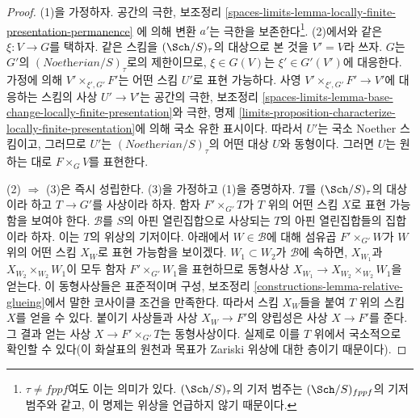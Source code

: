 \begin{proof}
(1)을 가정하자. 공간의 극한, 보조정리
\ref{spaces-limits-lemma-locally-finite-presentation-permanence}
에 의해 변환 $a'$는 극한을 보존한다\footnote{$\tau \not = fppf$여도
이는 의미가 있다. $(\Sch/S)_\tau$의 기저 범주는
$(\Sch/S)_{fppf}$의 기저 범주와 같고, 이 명제는 위상을 언급하지 않기 때문이다.}.
(2)에서와 같은 $\xi : V \to G$를 택하자.
같은 스킴을 $(\Sch/S)_\tau$의 대상으로 본 것을 $V' = V$라 쓰자.
$G$는 $G'$의 $(\textit{Noetherian}/S)_\tau$로의 제한이므로,
$\xi \in G(V)$는 $\xi' \in G'(V')$에 대응한다.
가정에 의해 $V' \times_{\xi', G'} F'$는 어떤 스킴 $U'$로 표현 가능하다.
사영 $V' \times_{\xi', G'} F' \to V'$에 대응하는 스킴의 사상
$U' \to V'$는 공간의 극한, 보조정리
\ref{spaces-limits-lemma-base-change-locally-finite-presentation}와
극한, 명제 \ref{limits-proposition-characterize-locally-finite-presentation}에
의해 국소 유한 표시이다.
따라서 $U'$는 국소 Noether 스킴이고, 그러므로 $U'$는
$(\textit{Noetherian}/S)_\tau$의 어떤 대상 $U$와 동형이다.
그러면 $U$는 원하는 대로 $F \times_G V$를 표현한다.

\medskip\noindent
(2) $\Rightarrow$ (3)은 즉시 성립한다. (3)을 가정하고 (1)을 증명하자.
$T$를 $(\Sch/S)_\tau$의 대상이라 하고 $T \to G'$를 사상이라 하자.
함자 $F' \times_{G'} T$가 $T$ 위의 어떤 스킴 $X$로 표현 가능함을
보여야 한다. $\mathcal{B}$를 $S$의 아핀 열린집합으로 사상되는
$T$의 아핀 열린집합들의 집합이라 하자. 이는 $T$의 위상의 기저이다.
아래에서 $W \in \mathcal{B}$에 대해 섬유곱 $F' \times_{G'} W$가
$W$ 위의 어떤 스킴 $X_W$로 표현 가능함을 보이겠다.
$W_1 \subset W_2$가 $\mathcal{B}$에 속하면,
$X_{W_1}$과 $X_{W_2} \times_{W_2} W_1$이 모두 함자
$F' \times_{G'} W_1$을 표현하므로 동형사상
$X_{W_1} \to X_{W_2} \times_{W_2} W_1$을 얻는다.
이 동형사상들은 표준적이며 구성, 보조정리
\ref{constructions-lemma-relative-glueing}에서 말한 코사이클 조건을 만족한다.
따라서 스킴 $X_W$들을 붙여 $T$ 위의 스킴 $X$를 얻을 수 있다.
붙이기 사상들과 사상 $X_W \to F'$의 양립성은 사상 $X \to F'$를 준다.
그 결과 얻는 사상 $X \to F' \times_{G'} T$는 동형사상이다.
실제로 이를 $T$ 위에서 국소적으로 확인할 수 있다(이 화살표의 원천과
목표가 Zariski 위상에 대한 층이기 때문이다).


\end{proof}
